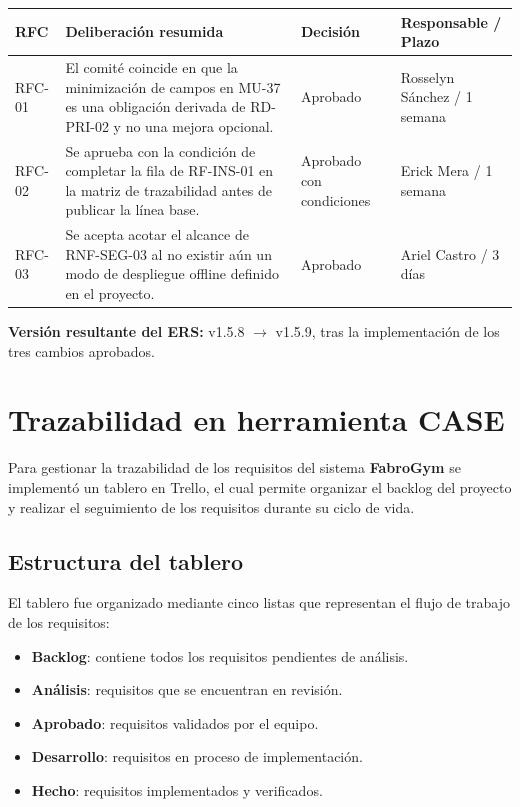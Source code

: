 \documentclass[11pt,a4paper]{article}
\begin{document}
\renewcommand{\arraystretch}{1.25}
\begin{tabularx}{\textwidth}{|C{1.4cm}|Y|L{3.4cm}|L{3.8cm}|}
\hline
\textbf{RFC} & \textbf{Deliberación resumida} & \textbf{Decisión} & \textbf{Responsable / Plazo} \\ \hline
RFC-01 & El comité coincide en que la minimización de campos en MU-37 es una obligación derivada de RD-PRI-02 y no una mejora opcional. & Aprobado & Rosselyn Sánchez / 1 semana \\ \hline
RFC-02 & Se aprueba con la condición de completar la fila de RF-INS-01 en la matriz de trazabilidad antes de publicar la línea base. & Aprobado con condiciones & Erick Mera / 1 semana \\ \hline
RFC-03 & Se acepta acotar el alcance de RNF-SEG-03 al no existir aún un modo de despliegue offline definido en el proyecto. & Aprobado & Ariel Castro / 3 días \\ \hline
\end{tabularx}

\textbf{Versión resultante del ERS:} v1.5.8 $\rightarrow$ v1.5.9, tras la implementación de los tres cambios aprobados.



\section{Trazabilidad en herramienta CASE}

Para gestionar la trazabilidad de los requisitos del sistema \textbf{FabroGym} se implementó un tablero en Trello, el cual permite organizar el backlog del proyecto y realizar el seguimiento de los requisitos durante su ciclo de vida.

\subsection{Estructura del tablero}

El tablero fue organizado mediante cinco listas que representan el flujo de trabajo de los requisitos:

\begin{itemize}
    \item \textbf{Backlog}: contiene todos los requisitos pendientes de análisis.
    \item \textbf{Análisis}: requisitos que se encuentran en revisión.
    \item \textbf{Aprobado}: requisitos validados por el equipo.
    \item \textbf{Desarrollo}: requisitos en proceso de implementación.
    \item \textbf{Hecho}: requisitos implementados y verificados.
\end{itemize}
\end{document}
